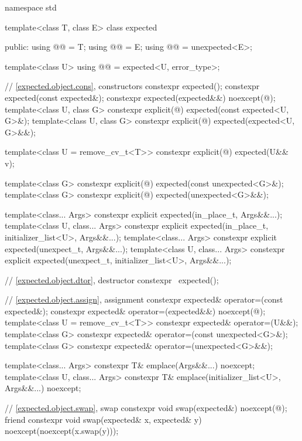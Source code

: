 \begin{codeblock}
namespace std {
  template<class T, class E>
  class expected {
  public:
    using @@ = T;
    using @@ = E;
    using @@ = unexpected<E>;

    template<class U>
    using @@ = expected<U, error_type>;

    // \ref{expected.object.cons}, constructors
    constexpr expected();
    constexpr expected(const expected&);
    constexpr expected(expected&&) noexcept(@\seebelow@);
    template<class U, class G>
      constexpr explicit(@\seebelow@) expected(const expected<U, G>&);
    template<class U, class G>
      constexpr explicit(@\seebelow@) expected(expected<U, G>&&);

    template<class U = remove_cv_t<T>>
      constexpr explicit(@\seebelow@) expected(U&& v);

    template<class G>
      constexpr explicit(@\seebelow@) expected(const unexpected<G>&);
    template<class G>
      constexpr explicit(@\seebelow@) expected(unexpected<G>&&);

    template<class... Args>
      constexpr explicit expected(in_place_t, Args&&...);
    template<class U, class... Args>
      constexpr explicit expected(in_place_t, initializer_list<U>, Args&&...);
    template<class... Args>
      constexpr explicit expected(unexpect_t, Args&&...);
    template<class U, class... Args>
      constexpr explicit expected(unexpect_t, initializer_list<U>, Args&&...);

    // \ref{expected.object.dtor}, destructor
    constexpr ~expected();

    // \ref{expected.object.assign}, assignment
    constexpr expected& operator=(const expected&);
    constexpr expected& operator=(expected&&) noexcept(@\seebelow@);
    template<class U = remove_cv_t<T>> constexpr expected& operator=(U&&);
    template<class G>
      constexpr expected& operator=(const unexpected<G>&);
    template<class G>
      constexpr expected& operator=(unexpected<G>&&);

    template<class... Args>
      constexpr T& emplace(Args&&...) noexcept;
    template<class U, class... Args>
      constexpr T& emplace(initializer_list<U>, Args&&...) noexcept;

    // \ref{expected.object.swap}, swap
    constexpr void swap(expected&) noexcept(@\seebelow@);
    friend constexpr void swap(expected& x, expected& y) noexcept(noexcept(x.swap(y)));

}}
\end{codeblock}
